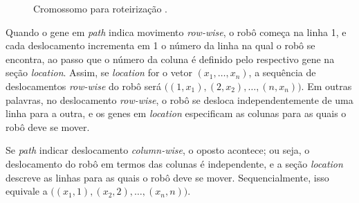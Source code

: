 \begin{figure}[ht]
    \centering
    \caption{Cromossomo para roteirização \cite{SEDIGHI2004}.}
    \label{fig:cromossomo roteirização}
\end{figure}

Quando o gene em \emph{path} indica movimento \emph{row-wise}, o robô começa na linha 1, e cada deslocamento incrementa em 1 o número da linha na qual o robô se encontra, ao passo que o número da coluna é definido pelo respectivo gene na seção \emph{location}. Assim, se \emph{location} for o vetor $(x_1, \dots, x_n)$, a sequência de deslocamentos \emph{row-wise} do robô será $\big((1, x_1), (2, x_2), \dots, (n, x_n)\big)$. Em outras palavras, no deslocamento \emph{row-wise}, o robô se desloca independentemente de uma linha para a outra, e os genes em \emph{location} especificam as colunas para as quais o robô deve se mover.

\sloppy Se \emph{path} indicar deslocamento \emph{column-wise}, o oposto acontece; ou seja, o deslocamento do robô em termos das colunas é independente, e a seção \emph{location} descreve as linhas para as quais o robô deve se mover. Sequencialmente, isso equivale a $\big((x_1, 1), (x_2, 2), \dots, (x_n, n)\big)$.

